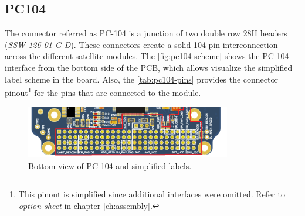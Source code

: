\subsection{PC104}

The connector referred as PC-104 is a junction of two double row 28H headers (\textit{SSW-126-01-G-D}). These connectors create a solid 104-pin interconnection across the different satellite modules. The \autoref{fig:pc104-scheme} shows the PC-104 interface from the bottom side of the PCB, which allows visualize the simplified label scheme in the board. Also, the \autoref{tab:pc104-pins} provides the connector pinout\footnote{This pinout is simplified since additional interfaces were omitted. Refer to \textit{option sheet} in chapter \ref{ch:assembly}.} for the pins that are connected to the module. 

\begin{figure}[!ht]
    \begin{center}
        \includegraphics[width=0.8\textwidth]{figures/eps2_pc104_scheme.png}
        \caption{Bottom view of PC-104 and simplified labels.}
        \label{fig:pc104-scheme}
    \end{center}
\end{figure}

